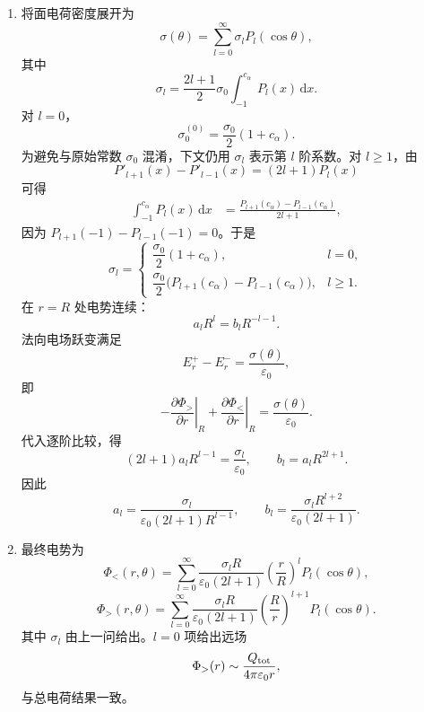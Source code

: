 \begin{question}[带缺口均匀带电球壳的静电势]
\begin{solution}
\begin{enumerate}
  \item 将面电荷密度展开为
  \[
    \sigma(\theta)=\sum_{l=0}^{\infty}\sigma_lP_l(\cos\theta),
  \]
  其中
  \[
    \sigma_l=\frac{2l+1}{2}\sigma_0\int_{-1}^{c_\alpha}P_l(x)\,\mathrm dx .
  \]
  对 $l=0$，
  \[
    \sigma_0^{(0)}=\frac{\sigma_0}{2}(1+c_\alpha) .
  \]
  为避免与原始常数 $\sigma_0$ 混淆，下文仍用 $\sigma_l$ 表示第 $l$ 阶系数。对 $l\geq1$，由
  \[
    P'_{l+1}(x)-P'_{l-1}(x)=(2l+1)P_l(x)
  \]
  可得
  \[
  \begin{aligned}
    \int_{-1}^{c_\alpha}P_l(x)\,\mathrm dx
    &=\frac{P_{l+1}(c_\alpha)-P_{l-1}(c_\alpha)}{2l+1},
  \end{aligned}
  \]
  因为 $P_{l+1}(-1)-P_{l-1}(-1)=0$。于是
  \[
    \boxed{
    \sigma_l=\begin{cases}
      \dfrac{\sigma_0}{2}(1+c_\alpha), & l=0,\\[6pt]
      \dfrac{\sigma_0}{2}\bigl(P_{l+1}(c_\alpha)-P_{l-1}(c_\alpha)\bigr), & l\geq1 .
    \end{cases}}
  \]
  在 $r=R$ 处电势连续：
  \[
    a_lR^l=b_lR^{-l-1} .
  \]
  法向电场跃变满足
  \[
    E_r^+-E_r^- =\frac{\sigma(\theta)}{\varepsilon_0},
  \]
  即
  \[
    -\left.\frac{\partial\Phi_>}{\partial r}\right|_{R}
    +\left.\frac{\partial\Phi_<}{\partial r}\right|_{R}
    =\frac{\sigma(\theta)}{\varepsilon_0} .
  \]
  代入逐阶比较，得
  \[
    (2l+1)a_lR^{l-1}=\frac{\sigma_l}{\varepsilon_0},
    \qquad
    b_l=a_lR^{2l+1} .
  \]
  因此
  \[
    a_l=\frac{\sigma_l}{\varepsilon_0(2l+1)R^{l-1}},
    \qquad
    b_l=\frac{\sigma_lR^{l+2}}{\varepsilon_0(2l+1)} .
  \]

  \item 最终电势为
  \[
    \boxed{
    \Phi_<(r,\theta)=\sum_{l=0}^{\infty}
    \frac{\sigma_lR}{\varepsilon_0(2l+1)}
    \left(\frac{r}{R}\right)^lP_l(\cos\theta)} ,
  \]
  \[
    \boxed{
    \Phi_>(r,\theta)=\sum_{l=0}^{\infty}
    \frac{\sigma_lR}{\varepsilon_0(2l+1)}
    \left(\frac{R}{r}\right)^{l+1}P_l(\cos\theta)} .
  \]
  其中 $\sigma_l$ 由上一问给出。$l=0$ 项给出远场
  \[
    \Phi_>(r)\sim \frac{Q_{\rm tot}}{4\pi\varepsilon_0r},
  \]
  与总电荷结果一致。
\end{enumerate}
\end{solution}
\end{question}

